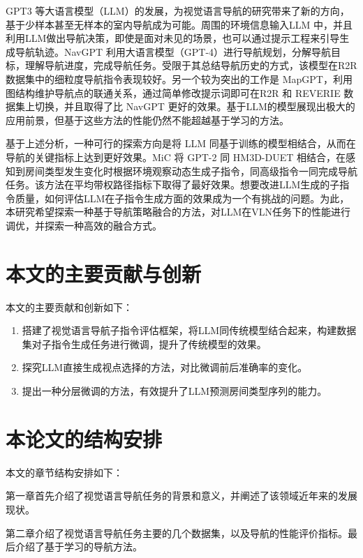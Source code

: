 \documentclass[bachelor]{thesis-uestc}
\begin{document}
GPT3\cite{ouyangTrainingLanguageModels2022} 等大语言模型（LLM）的发展，为视觉语言导航的研究带来了新的方向，基于少样本甚至无样本的室内导航成为可能。周围的环境信息输入LLM 中，并且利用LLM做出导航决策，即使是面对未见的场景，也可以通过提示工程来引导生成导航轨迹。NavGPT\cite{zhouNavGPTExplicitReasoning2023a} 利用大语言模型（GPT-4\cite{openaiGPT4TechnicalReport2024}）进行导航规划，分解导航目标，理解导航进度，完成导航任务。受限于其总结导航历史的方式，该模型在R2R数据集中的细粒度导航指令表现较好。另一个较为突出的工作是 MapGPT\cite{chenMapGPTMapGuidedPrompting2024}，利用图结构维护导航点的联通关系，通过简单修改提示词即可在R2R 和 REVERIE 数据集上切换，并且取得了比 NavGPT 更好的效果。基于LLM的模型展现出极大的应用前景，但基于这些方法的性能仍然不能超越基于学习的方法。

基于上述分析，一种可行的探索方向是将 LLM 同基于训练的模型相结合，从而在导航的关键指标上达到更好效果。MiC\cite{qiaoMarchChatInteractive2023} 将 GPT-2\cite{brownLanguageModelsAre2020} 同 HM3D-DUET \cite{chenLearningUnlabeled3D2022} 相结合，在感知到房间类型发生变化时根据环境观察动态生成子指令，同高级指令一同完成导航任务。该方法在平均带权路径指标下取得了最好效果。想要改进LLM生成的子指令质量，如何评估LLM在子指令生成方面的效果成为一个有挑战的问题。为此，本研究希望探索一种基于导航策略融合的方法，对LLM在VLN任务下的性能进行调优，并探索一种高效的融合方式。

\section{本文的主要贡献与创新}

本文的主要贡献和创新如下：
\begin{enumerate}
    \item 搭建了视觉语言导航子指令评估框架，将LLM同传统模型结合起来，构建数据集对子指令生成任务进行微调，提升了传统模型的效果。
    \item 探究LLM直接生成视点选择的方法，对比微调前后准确率的变化。
    \item 提出一种分层微调的方法，有效提升了LLM预测房间类型序列的能力。
\end{enumerate}
\section{本论文的结构安排}

本文的章节结构安排如下：

第一章首先介绍了视觉语言导航任务的背景和意义，并阐述了该领域近年来的发展现状。

第二章介绍了视觉语言导航任务主要的几个数据集，以及导航的性能评价指标。最后介绍了基于学习的导航方法。
\end{document}
